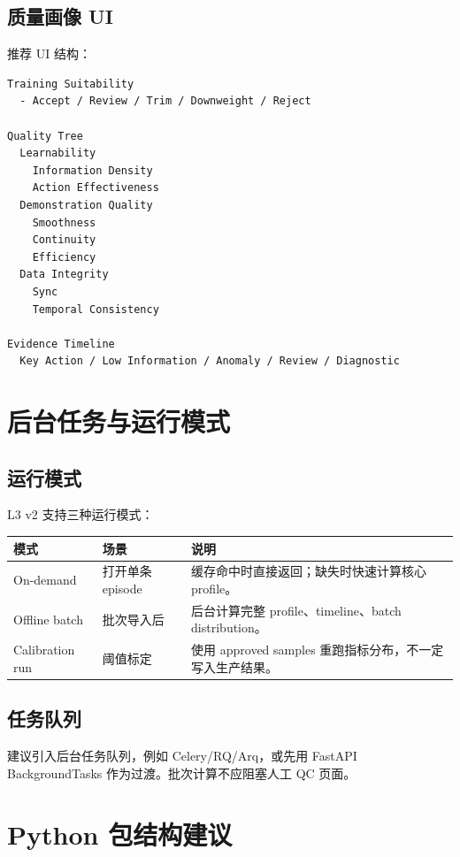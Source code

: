 \documentclass[UTF8,zihao=-4]{ctexart}
\begin{document}
\subsection{质量画像 UI}

推荐 UI 结构：

\begin{verbatim}
Training Suitability
  - Accept / Review / Trim / Downweight / Reject

Quality Tree
  Learnability
    Information Density
    Action Effectiveness
  Demonstration Quality
    Smoothness
    Continuity
    Efficiency
  Data Integrity
    Sync
    Temporal Consistency

Evidence Timeline
  Key Action / Low Information / Anomaly / Review / Diagnostic
\end{verbatim}

\section{后台任务与运行模式}

\subsection{运行模式}

L3 v2 支持三种运行模式：

\begin{longtable}{L{3cm} L{4cm} L{6.5cm}}
\toprule
模式 & 场景 & 说明 \\
\midrule
On-demand & 打开单条 episode & 缓存命中时直接返回；缺失时快速计算核心 profile。 \\
Offline batch & 批次导入后 & 后台计算完整 profile、timeline、batch distribution。 \\
Calibration run & 阈值标定 & 使用 approved samples 重跑指标分布，不一定写入生产结果。 \\
\bottomrule
\end{longtable}

\subsection{任务队列}

建议引入后台任务队列，例如 Celery/RQ/Arq，或先用 FastAPI BackgroundTasks 作为过渡。批次计算不应阻塞人工 QC 页面。

\section{Python 包结构建议}
\end{document}
